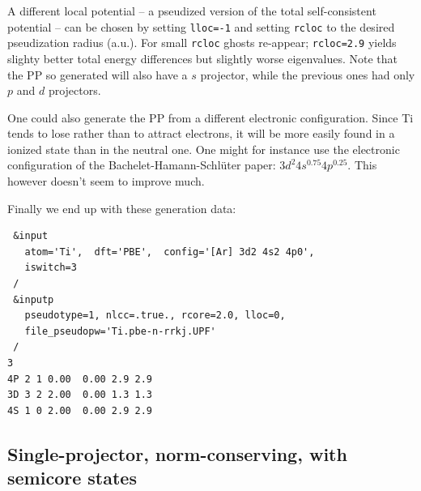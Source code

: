 \documentclass[12pt,a4paper]{article}
\begin{document}
A different local potential -- a pseudized version 
of the total self-consistent potential -- can be chosen 
by setting \texttt{lloc=-1} and setting \texttt{rcloc}
to the desired pseudization radius (a.u.). For small 
\texttt{rcloc} ghosts re-appear;  \texttt{rcloc=2.9}
yields slighty better total energy differences but slightly worse
eigenvalues. Note that the PP so generated will also have a 
$s$ projector, while the previous
ones had only $p$ and $d$ projectors. 

One could also generate the PP from a different electronic 
configuration. Since Ti tends to lose rather than to attract
electrons, it will be more easily found in a ionized state than
in the neutral one. One might for instance use the electronic
configuration of the Bachelet-Hamann-Schl\"uter paper\cite{BHS}:
$3d^2 4s^{0.75} 4p^{0.25}$. This however doesn't seem to improve
much. 

Finally we end up with these generation data:
\begin{verbatim}
 &input
   atom='Ti',  dft='PBE',  config='[Ar] 3d2 4s2 4p0',
   iswitch=3
 /
 &inputp
   pseudotype=1, nlcc=.true., rcore=2.0, lloc=0,
   file_pseudopw='Ti.pbe-n-rrkj.UPF'
 /
3
4P 2 1 0.00  0.00 2.9 2.9
3D 3 2 2.00  0.00 1.3 1.3
4S 1 0 2.00  0.00 2.9 2.9
\end{verbatim}

\subsection {Single-projector, norm-conserving, with semicore states}
\end{document}
